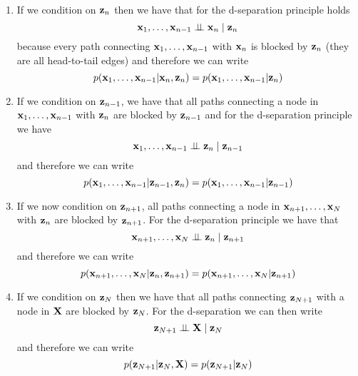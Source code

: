 \documentclass{amsmlaj}
\begin{document}
\begin{sol}
	\begin{enumerate}
		\item If we condition on $\bm{\mathbf{z}}_n$ then we have that for the d-separation
			principle holds
			\begin{equation}
				\bm{\mathbf{x}}_1,\dots,\bm{\mathbf{x}}_{n-1} \perp\!\!\!\perp \bm{\mathbf{x}}_n \mid \bm{\mathbf{z}}_n
			\end{equation}
			because every path connecting $\bm{\mathbf{x}}_1,\dots,\bm{\mathbf{x}}_{n-1}$ with
			$\bm{\mathbf{x}}_n$ is blocked by $\bm{\mathbf{z}}_n$ (they are all head-to-tail edges)
			and therefore we can write
			\begin{equation}
				p(\bm{\mathbf{x}}_1,\dots,\bm{\mathbf{x}}_{n-1}|\bm{\mathbf{x}}_n,\bm{\mathbf{z}}_n)=p(\bm{\mathbf{x}}_1,\dots,\bm{\mathbf{x}}_{n-1}|\bm{\mathbf{z}}_n)
			\end{equation}
		\item If we condition on $\bm{\mathbf{z}}_{n-1}$, we have that
			all paths connecting a node in $\bm{\mathbf{x}}_1,\dots,\bm{\mathbf{x}}_{n-1}$ with $\bm{\mathbf{z}}_n$
			are blocked by $\bm{\mathbf{z}}_{n-1}$ and for the d-separation principle we have
			\begin{equation}
				\bm{\mathbf{x}}_1,\dots,\bm{\mathbf{x}}_{n-1} \perp\!\!\!\perp \bm{\mathbf{z}}_n \mid \bm{\mathbf{z}}_{n-1}
			\end{equation}
			and therefore we can write
			\begin{equation}
				p(\bm{\mathbf{x}}_1,\dots,\bm{\mathbf{x}}_{n-1}|\bm{\mathbf{z}}_{n-1},\bm{\mathbf{z}}_n)=p(\bm{\mathbf{x}}_1,\dots,\bm{\mathbf{x}}_{n-1}|\bm{\mathbf{z}}_{n-1})
			\end{equation}
		\item If we now condition on $\bm{\mathbf{z}}_{n+1}$, all paths connecting a node in
			$\bm{\mathbf{x}}_{n+1},\dots,\bm{\mathbf{x}}_N$ with $\bm{\mathbf{z}}_n$ are blocked by
			$\bm{\mathbf{z}}_{n+1}$. For the d-separation principle we have that
			\begin{equation}
				\bm{\mathbf{x}}_{n+1},\dots,\bm{\mathbf{x}}_N \perp\!\!\!\perp \bm{\mathbf{z}}_n \mid \bm{\mathbf{z}}_{n+1}
			\end{equation}
			and therefore we can write
			\begin{equation}
				p(\bm{\mathbf{x}}_{n+1},\dots,\bm{\mathbf{x}}_N|\bm{\mathbf{z}}_n,\bm{\mathbf{z}}_{n+1})=p(\bm{\mathbf{x}}_{n+1},\dots,\bm{\mathbf{x}}_N|\bm{\mathbf{z}}_{n+1})
			\end{equation}
		\item If we condition on $\bm{\mathbf{z}}_N$ then we have that
			all paths connecting $\bm{\mathbf{z}}_{N+1}$ with a node in $\bm{\mathbf{X}}$
			are blocked by $\bm{\mathbf{z}}_N$. For the d-separation we can then write
			\begin{equation}
				\bm{\mathbf{z}}_{N+1} \perp\!\!\!\perp \bm{\mathbf{X}} \mid \bm{\mathbf{z}}_N
			\end{equation}
			and therefore we can write
			\begin{equation}
				p(\bm{\mathbf{z}}_{N+1}|\bm{\mathbf{z}}_N,\bm{\mathbf{X}})=p(\bm{\mathbf{z}}_{N+1}|\bm{\mathbf{z}}_N)
			\end{equation}
	\end{enumerate}
\end{sol}
\end{document}
